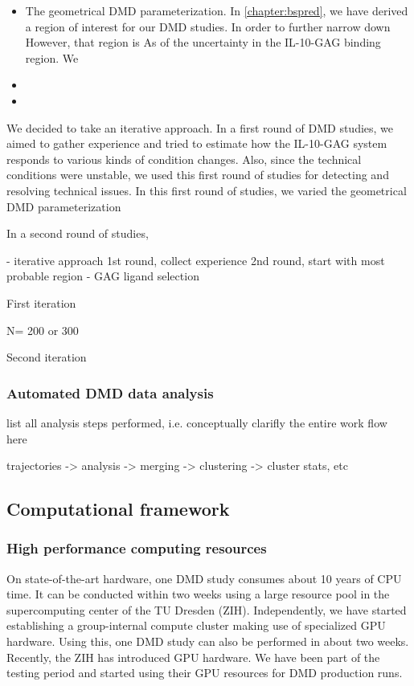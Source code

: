 \begin{itemize}
\item The geometrical DMD parameterization. In \cref{chapter:bspred}, we have
derived a region of interest for our DMD studies. In order to further narrow
down However, that region is As of the uncertainty in the IL-10-GAG binding
region. We
\item
\item
\end{itemize}

We decided to take an iterative approach. In a first round of DMD studies, we
aimed to gather experience and tried to estimate how the IL-10-GAG system
responds to various kinds of condition changes. Also, since the technical
conditions were unstable, we used this first round of studies for detecting
and resolving technical issues. In this first round of studies, we varied
the geometrical DMD parameterization


In a second round of studies,


        - iterative approach
            1st round, collect experience
            2nd round, start with most probable region
        - GAG ligand selection

First iteration


N= 200 or 300


Second iteration


\subsubsection{Automated DMD data analysis}

 list all analysis steps performed, i.e. conceptually clarifly the entire
 work flow here

 trajectories -> analysis -> merging -> clustering -> cluster stats, etc


\subsection{Computational framework}

\subsubsection{High performance computing resources}


 On state-of-the-art hardware, one
DMD study consumes about 10 years of CPU time. It can be conducted within two
weeks using a large resource pool in the supercomputing center of the TU Dresden (ZIH).
Independently, we have started establishing a group-internal compute cluster making
use of specialized GPU hardware. Using this, one DMD study can also be performed
in about two weeks. Recently, the ZIH has introduced GPU hardware. We have been
part of the testing period and started using their GPU resources for DMD production
runs.

